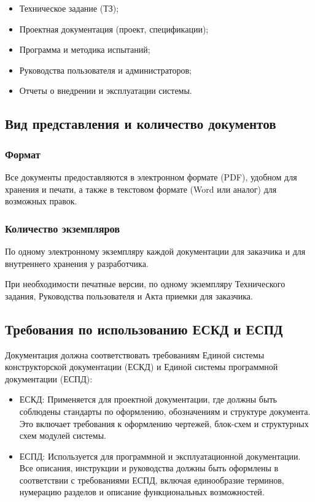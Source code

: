 \begin{itemize}
	\item Техническое задание (ТЗ);
	\item Проектная документация (проект, спецификации);
	\item Программа и методика испытаний;
	\item Руководства пользователя и администраторов;
	\item Отчеты о внедрении и эксплуатации системы.
\end{itemize}

\subsection{Вид представления и количество документов}

\subsubsection{Формат}

Все документы предоставляются в электронном формате (PDF),
удобном для хранения и печати,
а также в текстовом формате (Word или аналог) для возможных правок.

\subsubsection{Количество экземпляров}

По одному электронному экземпляру каждой документации
для заказчика и для внутреннего хранения у разработчика.

При необходимости печатные версии, по одному экземпляру Технического задания,
Руководства пользователя и Акта приемки для заказчика.

\subsection{Требования по использованию ЕСКД и ЕСПД}

Документация должна соответствовать требованиям
Единой системы конструкторской документации (ЕСКД)
и Единой системы программной документации (ЕСПД):

\begin{itemize}
	\item ЕСКД: Применяется для проектной документации,
		где должны быть соблюдены стандарты по оформлению, обозначениям
		и структуре документа.
		Это включает требования к оформлению чертежей,
		блок-схем и структурных схем модулей системы.
	\item ЕСПД: Используется для программной и эксплуатационной документации.
		Все описания, инструкции и руководства должны быть оформлены
		в соответствии с требованиями ЕСПД, включая единообразие терминов,
		нумерацию разделов и описание функциональных возможностей.
\end{itemize}

